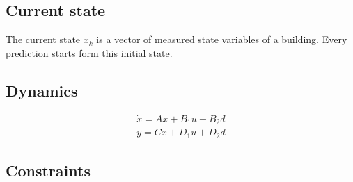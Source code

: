 \subsection{Current state}
\label{subsection:currentstate}
The current state $x_k$ is a vector of measured state variables of a building. Every prediction starts form this initial state\cite{Oldewurtel.2012}.
\subsection{Dynamics}
\label{subsection:dynamics}
\begin{align}
\label{eq:statespace}
\dot{x}=Ax+B_1u+B_2d\\
y=Cx+D_1u+D_2d
\end{align}


\subsection{Constraints}
\label{subsection:constraints}




%
%



